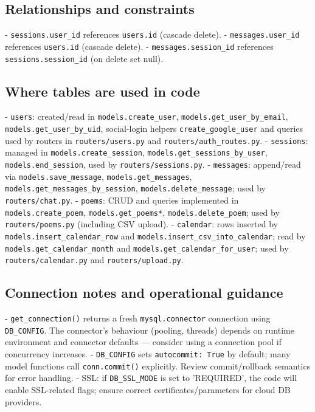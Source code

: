 \documentclass[11pt]{article}
\begin{document}
\subsection*{Relationships and constraints}
- \texttt{sessions.user\_id} references \texttt{users.id} (cascade delete).
- \texttt{messages.user\_id} references \texttt{users.id} (cascade delete).
- \texttt{messages.session\_id} references \texttt{sessions.session\_id} (on delete set null).

\subsection*{Where tables are used in code}
- \texttt{users}: created/read in \texttt{models.create\_user}, \texttt{models.get\_user\_by\_email}, \texttt{models.get\_user\_by\_uid}, social-login helpers \texttt{create\_google\_user} and queries used by routers in \texttt{routers/users.py} and \texttt{routers/auth\_routes.py}.
- \texttt{sessions}: managed in \texttt{models.create\_session}, \texttt{models.get\_sessions\_by\_user}, \texttt{models.end\_session}, used by \texttt{routers/sessions.py}.
- \texttt{messages}: append/read via \texttt{models.save\_message}, \texttt{models.get\_messages}, \texttt{models.get\_messages\_by\_session}, \texttt{models.delete\_message}; used by \texttt{routers/chat.py}.
- \texttt{poems}: CRUD and queries implemented in \texttt{models.create\_poem}, \texttt{models.get\_poems*}, \texttt{models.delete\_poem}; used by \texttt{routers/poems.py} (including CSV upload).
- \texttt{calendar}: rows inserted by \texttt{models.insert\_calendar\_row} and \texttt{models.insert\_csv\_into\_calendar}; read by \texttt{models.get\_calendar\_month} and \texttt{models.get\_calendar\_for\_user}; used by \texttt{routers/calendar.py} and \texttt{routers/upload.py}.

\subsection*{Connection notes and operational guidance}
- \texttt{get\_connection()} returns a fresh \texttt{mysql.connector} connection using \texttt{DB\_CONFIG}. The connector's behaviour (pooling, threads) depends on runtime environment and connector defaults — consider using a connection pool if concurrency increases.
- \texttt{DB\_CONFIG} sets \texttt{autocommit: True} by default; many model functions call \texttt{conn.commit()} explicitly. Review commit/rollback semantics for error handling.
- SSL: if \texttt{DB\_SSL\_MODE} is set to 'REQUIRED', the code will enable SSL-related flags; ensure correct certificates/parameters for cloud DB providers.
\end{document}
